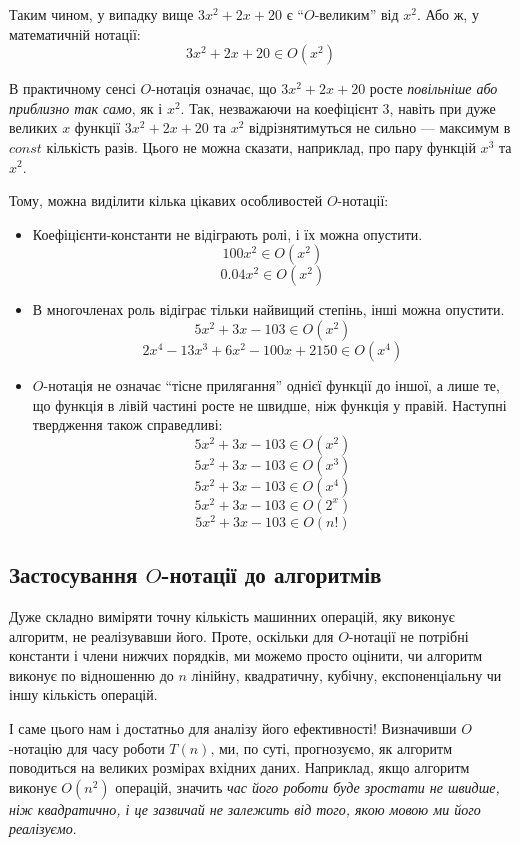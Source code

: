 \documentclass[12pt,a4paper]{report}
\begin{document}
Таким чином, у випадку вище \(3x^2 + 2x + 20\) є ``\(O\)-великим'' від \(x^2\).
Або ж, у математичній нотації:
\[3x^2 + 2x + 20 \in O(x^2)\]

В практичному сенсі \(O\)-нотація означає, що \(3x^2 + 2x + 20\) росте \emph{повільніше або приблизно так само}, як і \(x^2\).
Так, незважаючи на коефіцієнт \(3\), навіть при дуже великих \(x\) функції \(3x^2 + 2x + 20\) та \(x^2\) відрізнятимуться не сильно --- максимум в \(const\) кількість разів. Цього не можна сказати, наприклад, про пару функцій \(x^3\) та \(x^2\).

Тому, можна виділити кілька цікавих особливостей \(O\)-нотації:
\begin{itemize}
    \item Коефіцієнти-константи не відіграють ролі, і їх можна опустити.
        \[100x^2 \in O(x^2)\]
        \[0.04x^2 \in O(x^2)\]
    \item В многочленах роль відіграє тільки найвищий степінь, інші можна опустити.
        \[5x^2 + 3x - 103 \in O(x^2)\]
        \[2x^4 - 13x^3 + 6x^2 - 100x + 2150 \in O(x^4)\]
    \item \(O\)-нотація не означає ``тісне прилягання'' однієї функції до іншої, а лише те, що функція в лівій частині росте не швидше, ніж функція у правій. Наступні твердження також справедливі:
        \[5x^2 + 3x - 103 \in O(x^2)\]
        \[5x^2 + 3x - 103 \in O(x^3)\]
        \[5x^2 + 3x - 103 \in O(x^4)\]
        \[5x^2 + 3x - 103 \in O(2^x)\]
        \[5x^2 + 3x - 103 \in O(n!)\]

\end{itemize}


\subsection*{Застосування \(O\)-нотації до алгоритмів}

Дуже складно виміряти точну кількість машинних операцій, яку виконує алгоритм, не реалізувавши його.
Проте, оскільки для \(O\)-нотації не потрібні константи і члени нижчих порядків, ми можемо просто оцінити, чи алгоритм виконує по відношенню до \(n\) лінійну, квадратичну, кубічну, експоненціальну чи іншу кількість операцій.

І саме цього нам і достатньо для аналізу його ефективності!
Визначивши \(O\)-нотацію для часу роботи \(T(n)\), ми, по суті, прогнозуємо, як алгоритм поводиться на великих розмірах вхідних даних.
Наприклад, якщо алгоритм виконує \(O(n^2)\) операцій, значить \emph{час його роботи буде зростати не швидше, ніж квадратично, і це зазвичай не залежить від того, якою мовою ми його реалізуємо}.
\end{document}
